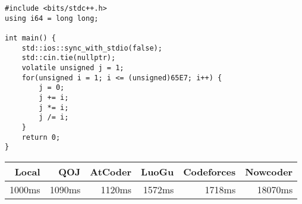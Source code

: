 \begin{lstlisting}[style=cppstyle]
#include <bits/stdc++.h>
using i64 = long long;

int main() {
    std::ios::sync_with_stdio(false);
    std::cin.tie(nullptr);
    volatile unsigned j = 1;
    for(unsigned i = 1; i <= (unsigned)65E7; i++) {
        j = 0;
        j += i;
        j *= i;
        j /= i;
    }
    return 0;
}
\end{lstlisting}
\begin{center}
    \begin{tabular}{|r|r|r|r|r|r|}
        \hline
        \rowcolor{gray!20}
        Local       & QOJ       & AtCoder   & LuoGu     & Codeforces    & Nowcoder  \\ \hline
        1000ms      & 1090ms    & 1120ms    & 1572ms    & 1718ms        & 18070ms   \\ \hline
    \end{tabular}\\
\end{center}
